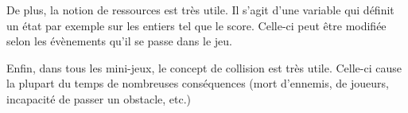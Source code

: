 De plus, la notion de ressources est très utile. Il s'agit d'une variable qui définit un état par exemple sur les entiers tel que le score.
Celle-ci peut être modifiée selon les évènements qu'il se passe dans le jeu.

Enfin, dans tous les mini-jeux, le concept de collision est très utile. Celle-ci cause la plupart du temps de nombreuses conséquences (mort d'ennemis, de joueurs,
incapacité de passer un obstacle, etc.)